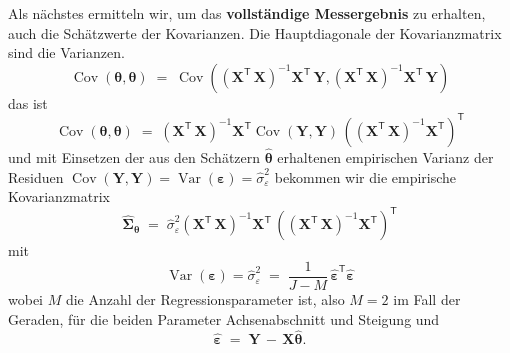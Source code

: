 Als nächstes ermitteln wir, um das \textbf{vollständige
	Messergebnis} zu erhalten, auch die Schätz\-werte der Kovarianzen. Die
Hauptdiagonale der Kovarianzmatrix sind die Varianzen.
\begin{equation}
\operatorname {Cov}( \boldsymbol{\theta},\boldsymbol{\theta} ) \; = \;
\operatorname {Cov}
\left(\left( \mathbf{X}^\mathsf{T}  \, \mathbf{X} \right)^{-1} \mathbf{X}^\mathsf{T} \, \mathbf{Y}, \left( \mathbf{X}^\mathsf{T}  \, \mathbf{X} \right)^{-1} \mathbf{X}^\mathsf{T} \, \mathbf{Y}\right)
\end{equation}
das ist
\begin{equation}
\operatorname {Cov}( \boldsymbol{\theta}, \boldsymbol{\theta} ) \; = \;
\left( \mathbf{X}^\mathsf{T}  \, \mathbf{X} \right)^{-1} \mathbf{X}^\mathsf{T} \operatorname {Cov} (\mathbf{Y}, \mathbf{Y}) \, \left( \left( \mathbf{X}^\mathsf{T}  \, \mathbf{X} \right)^{-1} \mathbf{X}^\mathsf{T} \right)^\mathsf{T}
\end{equation}
und mit Einsetzen der aus den Schätzern $\boldsymbol{\hat \theta}$ erhaltenen
empirischen Varianz der Residuen
$\operatorname {Cov} (\mathbf{Y}, \mathbf{Y}) = \operatorname {Var} (\mathbf{\varepsilon}) = \hat \sigma_{\varepsilon}^2$
bekommen wir die empirische Kovarianzmatrix
\begin{equation}
\boldsymbol{\hat \Sigma}_{\boldsymbol{\theta}} \; = \;
\hat \sigma_{\varepsilon}^2
\left( \mathbf{X}^\mathsf{T}  \, \mathbf{X} \right)^{-1} \mathbf{X}^\mathsf{T} \, \left( \left( \mathbf{X}^\mathsf{T}  \, \mathbf{X} \right)^{-1} \mathbf{X}^\mathsf{T} \right)^\mathsf{T}
\end{equation}
mit
$$
\operatorname {Var} (\mathbf{\varepsilon}) = \hat \sigma_{\varepsilon}^2 \; = \;
\frac{1}{J-M} \, \boldsymbol{\hat \varepsilon}^\mathsf{T} \boldsymbol{\hat \varepsilon}
$$
wobei $M$ die Anzahl der Regressionsparameter ist, also $M = 2$ im Fall der Geraden, für die beiden Parameter Achsenabschnitt und Steigung und
$$
\boldsymbol{\hat \varepsilon} \; = \; \mathbf{Y} \, - \, \mathbf{X} \boldsymbol{\hat \theta} .
$$

